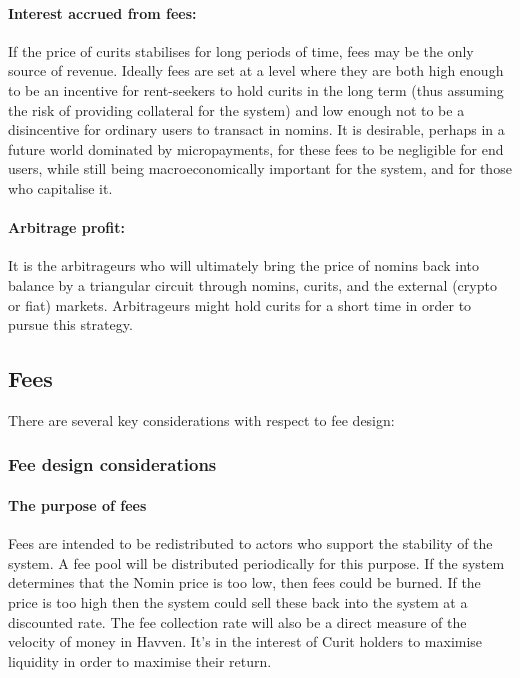 \paragraph{Interest accrued from fees:}
If the price of curits stabilises for long periods of time, fees may be the only source of revenue. Ideally fees are set at a level where they are both high enough to be an incentive for rent-seekers to hold curits in the long term (thus assuming the risk of providing collateral for the system) and low enough not to be a disincentive for ordinary users to transact in nomins.
It is desirable, perhaps in a future world dominated by micropayments, for these fees to be negligible for end users, while still being macroeconomically important for the system, and for those who capitalise it.

\paragraph{Arbitrage profit:}
It is the arbitrageurs who will ultimately bring the price of nomins back into balance by a triangular circuit through nomins, curits, and the external (crypto or fiat) markets. Arbitrageurs might hold curits for a short time in order to pursue this strategy.




\pagebreak
\subsection{Fees}

There are several key considerations with respect to fee design:

\subsubsection{Fee design considerations}

\paragraph{The purpose of fees}

Fees are intended to be redistributed to actors who support the stability of the system. A fee pool will be distributed periodically for this purpose. If the system determines that the Nomin price is too low, then fees could be burned. If the price is too high then the system could sell these back into the system at a discounted rate. The fee collection rate will also be a direct measure of the velocity of money in Havven. It's in the interest of Curit holders to maximise liquidity in order to maximise their return.


